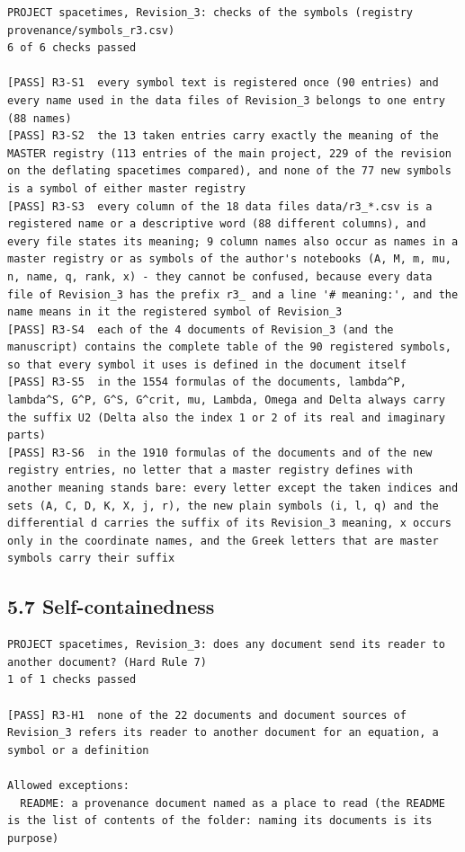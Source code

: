 \documentclass[
  10pt,
]{article}
\begin{document}
\begin{verbatim}
PROJECT spacetimes, Revision_3: checks of the symbols (registry provenance/symbols_r3.csv)
6 of 6 checks passed

[PASS] R3-S1  every symbol text is registered once (90 entries) and every name used in the data files of Revision_3 belongs to one entry (88 names)
[PASS] R3-S2  the 13 taken entries carry exactly the meaning of the MASTER registry (113 entries of the main project, 229 of the revision on the deflating spacetimes compared), and none of the 77 new symbols is a symbol of either master registry
[PASS] R3-S3  every column of the 18 data files data/r3_*.csv is a registered name or a descriptive word (88 different columns), and every file states its meaning; 9 column names also occur as names in a master registry or as symbols of the author's notebooks (A, M, m, mu, n, name, q, rank, x) - they cannot be confused, because every data file of Revision_3 has the prefix r3_ and a line '# meaning:', and the name means in it the registered symbol of Revision_3
[PASS] R3-S4  each of the 4 documents of Revision_3 (and the manuscript) contains the complete table of the 90 registered symbols, so that every symbol it uses is defined in the document itself
[PASS] R3-S5  in the 1554 formulas of the documents, lambda^P, lambda^S, G^P, G^S, G^crit, mu, Lambda, Omega and Delta always carry the suffix U2 (Delta also the index 1 or 2 of its real and imaginary parts)
[PASS] R3-S6  in the 1910 formulas of the documents and of the new registry entries, no letter that a master registry defines with another meaning stands bare: every letter except the taken indices and sets (A, C, D, K, X, j, r), the new plain symbols (i, l, q) and the differential d carries the suffix of its Revision_3 meaning, x occurs only in the coordinate names, and the Greek letters that are master symbols carry their suffix
\end{verbatim}

\hypertarget{self-containedness}{%
\subsection{5.7 Self-containedness}\label{self-containedness}}

\begin{verbatim}
PROJECT spacetimes, Revision_3: does any document send its reader to another document? (Hard Rule 7)
1 of 1 checks passed

[PASS] R3-H1  none of the 22 documents and document sources of Revision_3 refers its reader to another document for an equation, a symbol or a definition

Allowed exceptions:
  README: a provenance document named as a place to read (the README is the list of contents of the folder: naming its documents is its purpose)
\end{verbatim}
\end{document}

